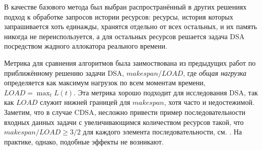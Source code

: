 В качестве базового метода был выбран распространённый в других решениях подход к обработке запросов истории ресурсов: ресурсы, история которых запрашивается хоть единажды, хранятся отдельно от всех остальных, и их память никогда не переиспользуется, а для остальных ресурсов решается задача DSA посредством жадного аллокатора реального времени.

Метрика для сравнения алгоритмов была заимоствована из предыдущих работ по приближённому решению задачи DSA, $makespan/LOAD$, где \textit{общая нагрузка} определяется как максимум нагрузок по всем моментам времени, $LOAD = \max_t L(t)$.
Эта метрика хорошо подходит для исследования DSA, так как $LOAD$ служит нижней границей для $makespan$, хотя часто и недостежимой.
Заметим, что в случае CDSA, несложно привести пример последовательности входных данных задачи с увеличивающимся количеством ресурсов такой, что $makespan/LOAD \geqslant 3/2$ для каждого элемента последовательности, см. \cite{myarticle}.
На практике, однако, подобные эффекты не возникают.

